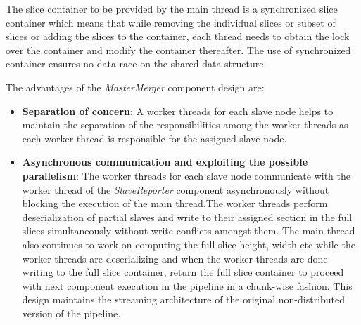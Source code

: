 The slice container to be provided by the main thread is a synchronized slice container which means that while removing the individual slices or subset of slices or adding the slices to the container, each thread needs to obtain the lock over the container and modify the container thereafter. The use of synchronized container ensures no data race on the shared data structure. \newline 

The advantages of the \textit{MasterMerger} component design are:  
\begin{itemize}
\item \textbf{Separation of concern}: A worker threads for each slave node helps to maintain the separation of the responsibilities among the worker threads as each worker thread is responsible for the assigned slave node.
\item \textbf{Asynchronous communication and exploiting the possible parallelism}: The worker threads for each slave node communicate with the worker thread of the \textit{SlaveReporter} component asynchronously without blocking the execution of the main thread.The worker threads perform deserialization of partial slaves and write to their assigned section in the full slices simultaneously without write conflicts amongst them. The main thread also continues to work on computing the full slice height, width etc while the worker threads are deserializing and when the worker threads are done writing to the full slice container, return the full slice container to proceed with next  component execution in the pipeline in a chunk-wise fashion. This design maintains the streaming architecture of the original non-distributed version of the pipeline. 
\end{itemize}

